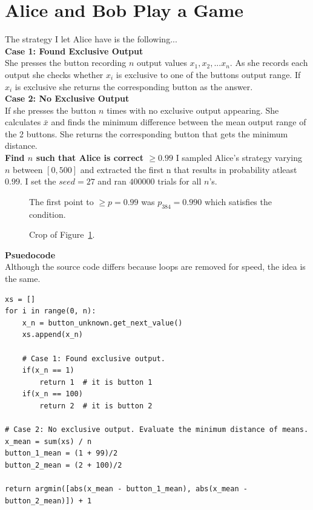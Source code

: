 \documentclass[twocolumn]{article}
\begin{document}
\section{Alice and Bob Play a Game}
The strategy I let Alice have is the following...
\\

\noindent
\textbf{Case 1: Found Exclusive Output}\\
She presses the button recording $n$ output values $x_1, x_2, ... x_n$.
As she records each output she checks whether $x_i$ is exclusive to one of the buttons output range. If $x_i$ is exclusive she returns the corresponding button as the answer.
\\

\noindent
\textbf{Case 2: No Exclusive Output}\\
If she presses the button $n$ times with no exclusive output appearing. She calculates $\bar{x}$ and finds the minimum difference between the mean output range of the 2 buttons. She returns the corresponding button that gets the minimum distance.
\\

\noindent
\textbf{Find $n$ such that Alice is correct $\ge 0.99$}
I sampled Alice's strategy varying $n$ between $[0, 500]$ and extracted the first n that results in probability atleast $0.99$. I set the $seed=27$ and  ran $400000$ trials for all $n$'s.

\begin{figure}[H]
	\centering
	\caption{The first point to $\ge p=0.99$ was $p_{384}=0.990$ which satisfies the condition.}
	\label{fig:Figure2}
\end{figure}

\begin{figure}[H]
	\centering
	\caption{Crop of Figure~\ref{fig:Figure2}.}
\end{figure}

\noindent
\textbf{Psuedocode}\\
Although the source code differs because loops are removed for speed, the idea is the same.


\begin{lstlisting}
xs = []
for i in range(0, n):	
	x_n = button_unknown.get_next_value()
	xs.append(x_n) 	
	
	# Case 1: Found exclusive output.
	if(x_n == 1)
		return 1  # it is button 1
	if(x_n == 100)
		return 2  # it is button 2
		
# Case 2: No exclusive output. Evaluate the minimum distance of means.
x_mean = sum(xs) / n
button_1_mean = (1 + 99)/2
button_2_mean = (2 + 100)/2

return argmin([abs(x_mean - button_1_mean), abs(x_mean - button_2_mean)]) + 1
\end{lstlisting}
\end{document}
